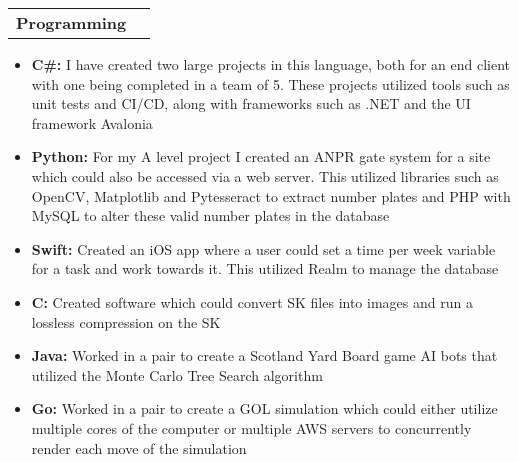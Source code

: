 \documentclass[a4paper,11pt]{article}
\makeatletter
\newcommand{\resumeBasicSubheading}[1]{
\vspace{0.5mm}\item
    \begin{tabular*}{0.98\textwidth}[t]{l@{\extracolsep{\fill}}r}
        \textbf{#1}
    \end{tabular*}
    \vspace{-2.4mm}
}
\newcommand{\resumeItemListStart}{\begin{justify}\begin{itemize}[leftmargin=3ex, rightmargin=2ex, noitemsep,labelsep=1.2mm,itemsep=0mm]\small}
\newcommand{\resumeItemListEnd}{\end{itemize}\end{justify}\vspace{-2mm}}
\makeatother
\begin{document}
    \resumeBasicSubheading
    {Programming} %

      \resumeItemListStart
  \item {\textbf{C\#:} I have created two large projects in this language, 
            both for an end client with one being completed in a team of 5. 
            These projects utilized tools such as unit tests and CI/CD, 
        along with frameworks such as .NET and the UI framework Avalonia}
    \item {\textbf{Python:} For my A level project I created an ANPR gate system for a site 
            which could also be accessed via a web server. This utilized libraries such 
        as OpenCV, Matplotlib and Pytesseract to extract number plates and PHP with MySQL
    to alter these valid number plates in the database}
    \item {\textbf{Swift:} Created an iOS app where a user could set a time per 
        week variable for a task and work towards it. This utilized Realm to manage 
    the database}
    \item {\textbf{C:} Created software which could convert SK files into images 
        and run a lossless compression on the SK}
    \item {\textbf{Java:} Worked in a pair to create a Scotland Yard Board game 
        AI bots that utilized the Monte Carlo Tree Search algorithm}
    \item {\textbf{Go:} Worked in a pair to create a GOL simulation which could 
        either utilize multiple cores of the computer or multiple AWS servers to 
    concurrently render each move of the simulation}
    \resumeItemListEnd
    \vspace{-2.0mm}
    
\end{document}
